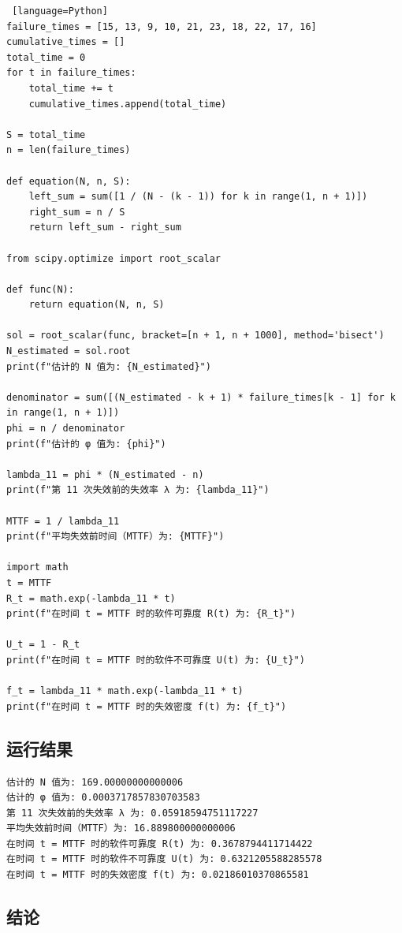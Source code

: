 \begin{lstlisting} [language=Python]
failure_times = [15, 13, 9, 10, 21, 23, 18, 22, 17, 16]
cumulative_times = []
total_time = 0
for t in failure_times:
    total_time += t
    cumulative_times.append(total_time)

S = total_time
n = len(failure_times)

def equation(N, n, S):
    left_sum = sum([1 / (N - (k - 1)) for k in range(1, n + 1)])
    right_sum = n / S
    return left_sum - right_sum

from scipy.optimize import root_scalar

def func(N):
    return equation(N, n, S)

sol = root_scalar(func, bracket=[n + 1, n + 1000], method='bisect')
N_estimated = sol.root
print(f"估计的 N 值为: {N_estimated}")

denominator = sum([(N_estimated - k + 1) * failure_times[k - 1] for k in range(1, n + 1)])
phi = n / denominator
print(f"估计的 φ 值为: {phi}")

lambda_11 = phi * (N_estimated - n)
print(f"第 11 次失效前的失效率 λ 为: {lambda_11}")

MTTF = 1 / lambda_11
print(f"平均失效前时间（MTTF）为: {MTTF}")

import math
t = MTTF
R_t = math.exp(-lambda_11 * t)
print(f"在时间 t = MTTF 时的软件可靠度 R(t) 为: {R_t}")

U_t = 1 - R_t
print(f"在时间 t = MTTF 时的软件不可靠度 U(t) 为: {U_t}")

f_t = lambda_11 * math.exp(-lambda_11 * t)
print(f"在时间 t = MTTF 时的失效密度 f(t) 为: {f_t}")
\end{lstlisting}

\subsection*{运行结果}

\begin{verbatim}
估计的 N 值为: 169.00000000000006
估计的 φ 值为: 0.0003717857830703583
第 11 次失效前的失效率 λ 为: 0.05918594751117227
平均失效前时间（MTTF）为: 16.889800000000006
在时间 t = MTTF 时的软件可靠度 R(t) 为: 0.3678794411714422
在时间 t = MTTF 时的软件不可靠度 U(t) 为: 0.6321205588285578
在时间 t = MTTF 时的失效密度 f(t) 为: 0.02186010370865581
\end{verbatim}

\subsection*{结论}

